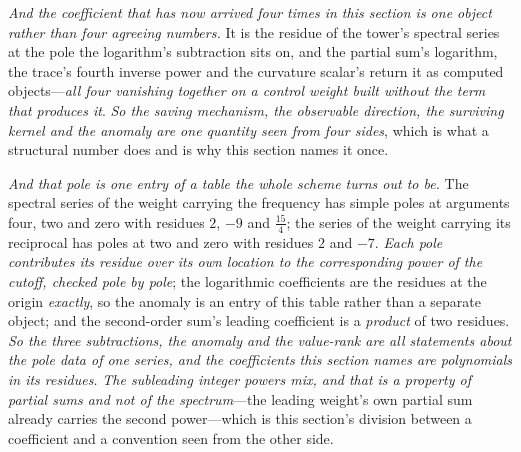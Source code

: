 \documentclass[11pt,a4paper]{article}
\theoremstyle{plain}
\theoremstyle{definition}
\theoremstyle{remark}
\begin{document}
\emph{And the coefficient that has now arrived four times in this section is one object rather than four
agreeing numbers.} It is the residue of the tower's spectral series at the pole the logarithm's subtraction
sits on, and the partial sum's logarithm, the trace's fourth inverse power and the curvature scalar's return
it as computed objects---\emph{all four vanishing together on a control weight built without the term that
produces it}. \emph{So the saving mechanism, the observable direction, the surviving kernel and the anomaly
are one quantity seen from four sides}, which is what a structural number does and is why this section names
it once.

\emph{And that pole is one entry of a table the whole scheme turns out to be.} The spectral series of the
weight carrying the frequency has simple poles at arguments four, two and zero with residues $2$, $-9$ and
$\tfrac{15}{4}$; the series of the weight carrying its reciprocal has poles at two and zero with residues $2$
and $-7$. \emph{Each pole contributes its residue over its own location to the corresponding power of the
cutoff, checked pole by pole}; the logarithmic coefficients are the residues at the origin \emph{exactly}, so
the anomaly is an entry of this table rather than a separate object; and the second-order sum's leading
coefficient is a \emph{product} of two residues. \emph{So the three subtractions, the anomaly and the
value-rank are all statements about the pole data of one series, and the coefficients this section names are
polynomials in its residues.} \emph{The subleading integer powers mix, and that is a property of partial sums
and not of the spectrum}---the leading weight's own partial sum already carries the second power---which is
this section's division between a coefficient and a convention seen from the other side.
\end{document}

